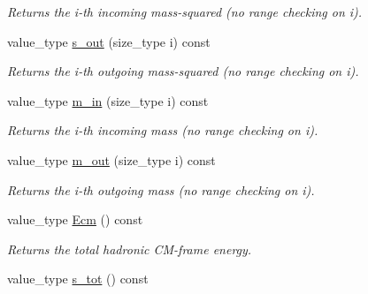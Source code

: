 \begin{DoxyCompactItemize}
\begin{DoxyCompactList}\small\item\em Returns the i-\/th incoming mass-\/squared (no range checking on i). \end{DoxyCompactList}\item 
\hypertarget{a00441_abd4ef01e821135a6e82ac6489effd53c}{value\-\_\-type \hyperlink{a00441_abd4ef01e821135a6e82ac6489effd53c}{s\-\_\-out} (size\-\_\-type i) const }\label{a00441_abd4ef01e821135a6e82ac6489effd53c}

\begin{DoxyCompactList}\small\item\em Returns the i-\/th outgoing mass-\/squared (no range checking on i). \end{DoxyCompactList}\item 
\hypertarget{a00441_a6e21b759d8125520edc89e2508962302}{value\-\_\-type \hyperlink{a00441_a6e21b759d8125520edc89e2508962302}{m\-\_\-in} (size\-\_\-type i) const }\label{a00441_a6e21b759d8125520edc89e2508962302}

\begin{DoxyCompactList}\small\item\em Returns the i-\/th incoming mass (no range checking on i). \end{DoxyCompactList}\item 
\hypertarget{a00441_ae5e72051c8b9d0a06e1a47e2f5cf48e4}{value\-\_\-type \hyperlink{a00441_ae5e72051c8b9d0a06e1a47e2f5cf48e4}{m\-\_\-out} (size\-\_\-type i) const }\label{a00441_ae5e72051c8b9d0a06e1a47e2f5cf48e4}

\begin{DoxyCompactList}\small\item\em Returns the i-\/th outgoing mass (no range checking on i). \end{DoxyCompactList}\item 
\hypertarget{a00441_ad2cd771c9367fc65df19d5b2ecdc408b}{value\-\_\-type \hyperlink{a00441_ad2cd771c9367fc65df19d5b2ecdc408b}{Ecm} () const }\label{a00441_ad2cd771c9367fc65df19d5b2ecdc408b}

\begin{DoxyCompactList}\small\item\em Returns the total hadronic C\-M-\/frame energy. \end{DoxyCompactList}\item 
\hypertarget{a00441_a537a3b843c6f344767b390af3c3d2c2e}{value\-\_\-type \hyperlink{a00441_a537a3b843c6f344767b390af3c3d2c2e}{s\-\_\-tot} () const }\label{a00441_a537a3b843c6f344767b390af3c3d2c2e}


\end{DoxyCompactItemize}
